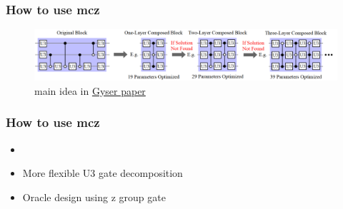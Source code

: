 \documentclass[18 pt]{beamer}
\begin{document}
\begin{frame}
    \frametitle{How to use mcz}
    \begin{figure}
        \includegraphics[width=\textwidth]{gyser.png}
        \caption{main idea in \href{https://dl.acm.org/doi/10.1145/3470496.3527428}{Gyser paper}}
    \end{figure}
\end{frame}
\begin{frame}
    \frametitle{How to use mcz}
    \begin{itemize}
        \item 
        \item More flexible U3 gate decomposition
        \item Oracle design using z group gate
    \end{itemize}
\end{frame}
\end{document}
